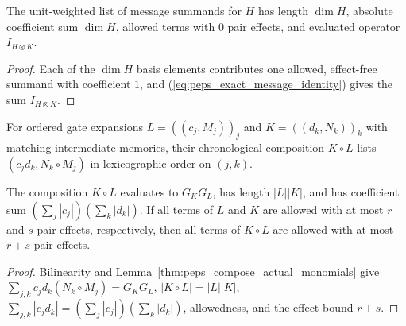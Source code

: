\begin{lemma}
    \label{thm:peps_message_expansion_count}
    \leanok
    The unit-weighted list of message summands for $H$ has length $\dim H$,
    absolute coefficient sum $\dim H$, allowed terms with $0$ pair effects, and
    evaluated operator $I_{H\otimes K}$.
\end{lemma}
\begin{proof}
    \leanok
    Each of the $\dim H$ basis elements contributes one allowed, effect-free
    summand with coefficient $1$, and (\ref{eq:peps_exact_message_identity})
    gives the sum $I_{H\otimes K}$.
\end{proof}

\begin{definition}
    \label{def:peps_composed_gate_expansion}
    \leanok
    For ordered gate expansions $L=((c_j,M_j))_j$ and $K=((d_k,N_k))_k$ with
    matching intermediate memories, their chronological composition $K\circ L$
    lists $(c_jd_k,N_k\circ M_j)$ in lexicographic order on $(j,k)$.
\end{definition}

\begin{lemma}
    \label{thm:peps_composed_gate_resources}
    \leanok
    The composition $K\circ L$ evaluates to $G_K G_L$, has length $|L||K|$,
    and has coefficient sum $(\sum_j|c_j|)(\sum_k|d_k|)$. If all terms of $L$
    and $K$ are allowed with at most $r$ and $s$ pair effects, respectively,
    then all terms of $K\circ L$ are allowed with at most $r+s$ pair effects.
\end{lemma}
\begin{proof}
    \leanok
    Bilinearity and Lemma~\ref{thm:peps_compose_actual_monomials} give
    $\sum_{j,k}c_jd_k(N_k\circ M_j)=G_K G_L$, $|K\circ L|=|L||K|$,
    $\sum_{j,k}|c_jd_k|=(\sum_j|c_j|)(\sum_k|d_k|)$, allowedness, and the effect
    bound $r+s$.
\end{proof}

